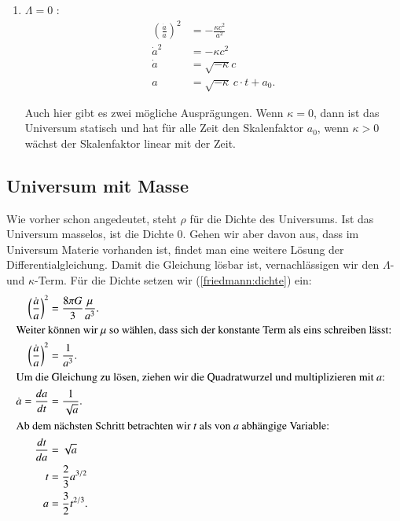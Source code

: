 \begin{refsection}
\begin{enumerate}
	\item $\Lambda = 0$ :
		\begin{align}
			\nonumber \left(\frac{\dot{a}}{a}\right) ^2 &= - \frac{\kappa c^2}{a^2}\\
			\nonumber \dot{a} ^2 &= - \kappa c^2 \\
			\nonumber \dot{a} &= \sqrt{- \kappa} c \\
			a &= \sqrt{- \kappa}\, c \cdot t + a_0.\label{friedmann:Kappa}
		\end{align}
		
Auch hier gibt es zwei mögliche Ausprägungen. Wenn $\kappa = 0$, dann ist das Universum statisch und hat für alle Zeit den Skalenfaktor $a_{0}$, wenn $\kappa > 0$ wächst der Skalenfaktor linear mit der Zeit.
	
\end{enumerate}

\subsection{Universum mit Masse \label{friedmann:UniversumMitMasse}} 
Wie vorher schon angedeutet, steht $\rho$ für die Dichte des Universums. Ist das Universum masselos, ist die Dichte 0. Gehen wir aber davon aus, dass im Universum Materie vorhanden ist, findet man eine weitere Lösung der Differentialgleichung. Damit die Gleichung lösbar ist, vernachlässigen wir den $\Lambda$- und $\kappa$-Term. Für die Dichte setzen wir (\ref{friedmann:dichte}) ein:
\begin{align}
	\nonumber\left(\frac{\dot{a}}{a}\right) ^2 &= \frac{8 \pi G}{3} \frac{\mu}{a^3}. \\
	\intertext{Weiter können wir $\mu$ so wählen, dass sich der konstante Term als eins schreiben lässt:}
	\nonumber \left(\frac{\dot{a}}{a}\right) ^2 &= \frac{1}{a^3}. \\
	\intertext{Um die Gleichung zu lösen, ziehen wir die Quadratwurzel und multiplizieren mit $a$:}
	\nonumber \dot{a} = \frac{da}{dt} &=\frac{1}{\sqrt{a}}. \\
	\intertext{Ab dem nächsten Schritt betrachten wir $t$ als von $a$ abhängige Variable:}
	\nonumber \frac{dt}{da} &= \sqrt{a} \\
	\nonumber t &= \frac{2}{3} a^{3/2} \\
	a &= \frac{3}{2} t^{2/3}. \label{friedmann:Masse}
\end{align}


\end{refsection}
